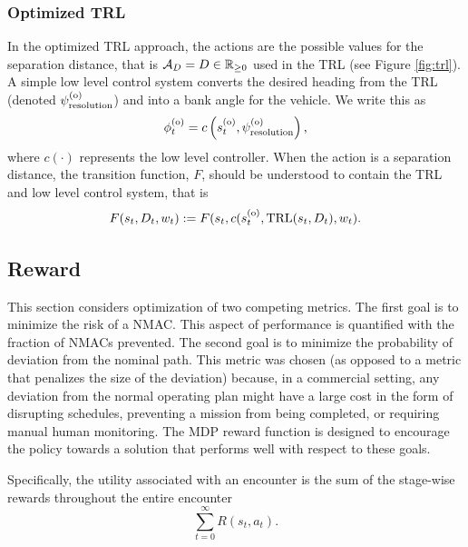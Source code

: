 \subsubsection{Optimized TRL}

In the optimized TRL approach, the actions are the possible values for the separation distance, that is ${\mathcal{A}}_{D} = D\in \mathbb{R}_{\geq 0}$ used in the TRL (see Figure \ref{fig:trl}).
A simple low level control system converts the desired heading from the TRL (denoted $\psi^{(\mathrm{o})}_\mathrm{resolution}$) and into a bank angle for the vehicle.
We write this as
\begin{equation}
    \phi^{(\mathrm{o})}_t = c\left(s^{(\mathrm{o})}_t, \psi^{(\mathrm{o})}_\mathrm{resolution} \right) \text{,}
\end{equation}
where $c(\cdot)$ represents the low level controller.
When the action is a separation distance, the transition function, $F$, should be understood to contain the TRL and low level control system, that is
\begin{equation}
    F(s_t, D_t, w_t) := F(s_t, c(s^{(\mathrm{o})}_t, \text{TRL}(s_t, D_t), w_t) \text{.}
\end{equation}

\subsection{Reward}\label{sec:rew}

This section considers optimization of two competing metrics. The first goal is to minimize the risk of a NMAC. This aspect of performance is quantified with the fraction of NMACs prevented. The second goal is to minimize the probability of deviation from the nominal path. This metric was chosen (as opposed to a metric that penalizes the size of the deviation) because, in a commercial setting, any deviation from the normal operating plan might have a large cost in the form of disrupting schedules, preventing a mission from being completed, or requiring manual human monitoring. The MDP reward function is designed to encourage the policy towards a solution that performs well with respect to these goals.  

Specifically, the utility associated with an encounter is the sum of the stage-wise rewards throughout  the entire encounter
\begin{equation}\label{eqn:encrew}
    \sum_{t=0}^\infty R(s_t, a_t) \text{.}
\end{equation}

